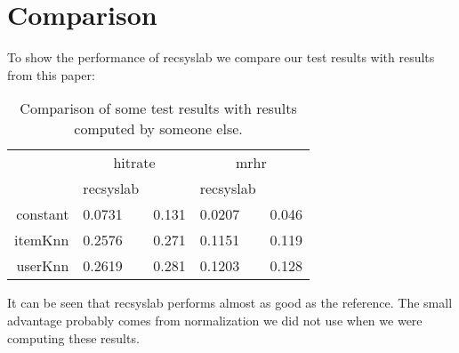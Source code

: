 \section{Comparison}
To show the performance of recsyslab we compare our test results with results 
from this paper:~\cite{deshpande2004item}

\begin{table}[h]
\begin{tabular}{rllll} \toprule
 & \multicolumn{2}{c}{hitrate} & \multicolumn{2}{c}{mrhr} \\ \cmidrule(r){2-3} \cmidrule(r){4-5}
 & recsyslab & \cite{deshpande2004item} & recsyslab & \cite{deshpande2004item} \\ \midrule
    constant & 0.0731 & 0.131 & 0.0207 & 0.046 \\
    itemKnn & 0.2576 & 0.271 & 0.1151 & 0.119 \\
    userKnn & 0.2619 & 0.281 & 0.1203 & 0.128 \\ \bottomrule
\end{tabular}
\caption{Comparison of some test results with results computed by someone else.}
\end{table}

It can be seen that recsyslab performs almost as good as the reference.
The small advantage probably comes from normalization we did not use when
we were computing these results.
